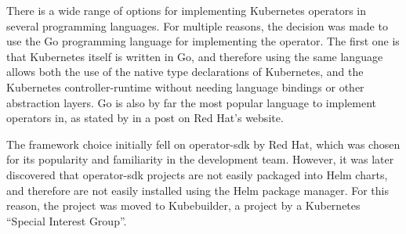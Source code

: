 There is a wide range of options for implementing Kubernetes operators in several programming languages.
For multiple reasons, the decision was made to use the Go programming language for implementing the operator.
The first one is that Kubernetes itself is written in Go, and therefore using the same language allows both the use of the native type declarations of Kubernetes, and the Kubernetes controller-runtime without needing language bindings or other abstraction layers.
Go is also by far the most popular language to implement operators in, as stated by \cite{redhatoperatorlanguages} in a post on Red Hat's website.

The framework choice initially fell on operator-sdk by Red Hat, which was chosen for its popularity and familiarity in the development team. However, it was later discovered that operator-sdk projects are not easily packaged into Helm charts, and therefore are not easily installed using the Helm package manager.
For this reason, the project was moved to Kubebuilder, a project by a Kubernetes \enquote{Special Interest Group}.
